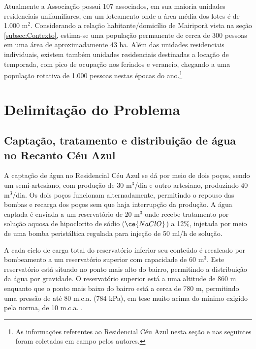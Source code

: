 Atualmente a Associação possui 107 associados, em sua maioria unidades residenciais unifamiliares, em um loteamento onde a área média dos lotes é de 1.000 m$^2$. Considerando a relação habitante/domicílio de Mairiporã vista na seção \ref{subsec:Contexto}, estima-se uma população permanente de cerca de 300 pessoas em uma área de aproximadamente 43 ha. Além das unidades residenciais individuais, existem também unidades residenciais destinadas a locação de temporada, com pico de ocupação nos feriados e veraneio, chegando a uma população rotativa de 1.000 pessoas nestas épocas do ano.\footnote{As informações referentes ao Residencial Céu Azul nesta seção e nas seguintes foram coletadas em campo pelos autores.}

\section{Delimitação do Problema}\label{sec:Delimitacao}

\subsection{Captação, tratamento e distribuição de água no Recanto Céu Azul}\label{subsec:capAguaCeuAzul}

A captação de água no Residencial Céu Azul se dá por meio de dois poços, sendo um semi-artesiano, com produção de 30 m$^3$/dia e outro artesiano, produzindo 40 m$^3$/dia. Os dois poços funcionam alternadamente, permitindo o repouso das bombas e recarga dos poços sem que haja interrupção da produção. A água captada é enviada a um reservatório de 20 m$^3$ onde recebe tratamento por solução aquosa de hipoclorito de sódio ($\ce{NaClO}$) a 12\%, injetada por meio de uma bomba peristáltica regulada para injeção de 50 ml/h de solução.

A cada ciclo de carga total do reservatório inferior seu conteúdo é recalcado por bombeamento a um reservatório superior com capacidade de 60 m$^3$. Este reservatório está situado no ponto mais alto do bairro, permitindo a distribuição da água por gravidade. O reservatório superior está a uma altitude de 860 m enquanto que o ponto mais baixo do bairro está a cerca de 780 m, permitindo uma pressão de até 80 m.c.a. (784 kPa), em tese muito acima do mínimo exigido pela norma, de 10 m.c.a. \cite{NBR12218}. 

